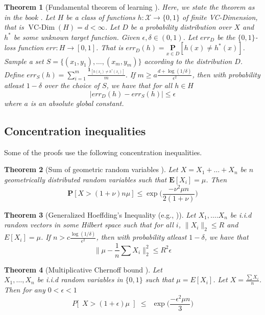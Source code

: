 \documentclass[12pt]{article}
\newcommand{\mc}{\mathcal}
\newcommand{\mb}{\mathbf}
\DeclareMathOperator{\vcdim}{VC-Dim}
\newtheorem{theorem}{Theorem}
\begin{document}
\begin{theorem}[Fundamental theorem of learning \cite{blumer1989learnability}] 
\label{thm:uniformConvergence}
Here, we state the theorem as in the book \cite{shalev2014understanding}. Let $H$ be a class of functions $h:\mc X \rightarrow \{0, 1\}$ of finite VC-Dimension, that is $\vcdim(H) = d < \infty$. Let $D$ be a probability distribution over $X$ and $h^*$ be some unknown target function. Given $\epsilon, \delta \in (0, 1)$. Let $err_D$ be the $\{0, 1\}$-loss function $err: H \rightarrow [0, 1]$. That is $err_D(h) = \underset{x \in D}{\mb P}[h(x) \neq h^*(x)]$. Sample a set $S = \{(x_1, y_1), \ldots, (x_m, y_m)\}$ according to the distribution $D$. Define $err_S(h) = \sum_{i=1}^{m} \frac{\mb 1_{[h(x_i) \neq h^*(x_i)]}}{m}$. If $m \ge a\frac{d + \log (1/\delta)}{\epsilon^2}$, then with probability atleast $1-\delta$ over the choice of $S$, we have that for all $h \in H$
$$|err_D(h) - err_S(h)| \le \epsilon$$
where $a$ is an absolute global constant. 
\end{theorem}

\subsection{Concentration inequalities}
Some of the proofs use the following concentration inequalities. 
\label{appendixsection:conIneq}
\begin{theorem}[Sum of geometric random variables \cite{brown2011wasted}]
\label{thm:geometricRV}
Let $X = X_1 + \ldots + X_n$ be $n$ geometrically distributed random variables such that $\mb E[X_i] = \mu$. Then 
$$\mb P[X > (1+\nu)n\mu] \le \exp\bigg(\frac{-\nu^2\mu n}{2(1+\nu)}\bigg)$$
\end{theorem}   

\begin{theorem}[Generalized Hoeffding's Inequality (e.g., \cite{ashtiani2015dimension})]
\label{thm:genHoeff}
Let $X_1, \ldots. X_n$ be i.i.d random vectors in some Hilbert space such that for all $i$, $\|X_i\|_2 \le R$ and $E[X_i] = \mu$. If $n > c\frac{\log(1/\delta)}{\epsilon^2}$, then with probability atleast $1-\delta$, we have that
$$\Big\|\mu - \frac{1}{n}\sum X_i\Big\|_2^2 \le R^2\epsilon$$ 
\end{theorem}

\begin{theorem}[Multiplicative Chernoff bound \cite{mitzenmacher2005probability}]
\label{thm:chernoff}
Let\\ $X_1, \ldots, X_n$ be i.i.d random variables in $\{0, 1\}$ such that $\mu = E[X_i]$. Let $X = \frac{\sum X_i}{n}$. Then for any $0 < \epsilon < 1$
$$P\big[ \enspace X > (1+\epsilon) \mu\enspace\big] \enspace\le\enspace \exp\bigg(\frac{-\epsilon^2\mu n}{3}\bigg)$$
\end{theorem}
\end{document}
